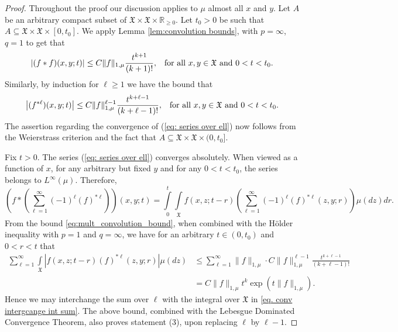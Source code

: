 \documentclass[11pt,reqno]{amsart}
\theoremstyle{remark}
\theoremstyle{definition}
\numberwithin{theorem}{section} \numberwithin{equation}{section}
\newcommand{\X}{\mathfrak{X}}
\begin{document}
\begin{proof} Throughout the proof our discussion applies to $\mu$ almost all $x$ and $y$.  Let $A$ be an arbitrary compact subset of $\X\times \X\times\mathbb{R}_{\geq0}$.
Let $t_0>0$ be such that $A\subseteq \X\times \X\times [0,t_0]$.
We apply Lemma \ref{lem:convolution bounds}, with $p=\infty$, $q=1$ to get that
\begin{equation*}
  \label{eq:4}
\left|(f\ast f)(x,y;t)\right| \leq C \|f\|_{1,\mu}\frac{t^{k+1}}{(k+1)!}, \,\,\,\,\,
\text{\rm for all $x,y\in \X$ and $0<t<t_{0}$.}
\end{equation*}
Similarly, by induction for $\ell\geq 1$ we have the bound that
\begin{equation}
  \label{eq:mult_convolution_bound}
\left|(f^{\ast\ell})(x,y;t)\right|
\leq
C\|f\|_{1,\mu}^{\ell-1}\frac{t^{k+\ell-1}}{(k+\ell-1)!}, \,\,\,\,\,
\text{\rm for all $x,y\in \X$ and $0<t<t_{0}$.}
\end{equation}
The assertion regarding the convergence of (\ref{eq: series over ell}) now follows
from the Weierstrass criterion and the fact that $A\subseteq \X\times \X\times (0,t_0]$.

Fix $t>0$. The series (\ref{eq: series over ell}) converges absolutely.  When viewed as
a function of $x$, for any arbitrary but fixed $y$ and for any $0<t<t_0$, the series belongs to $L^{\infty}(\mu)$. Therefore,
\begin{equation}\label{eq. conv intergcange int sum}
\left(f\ast\left(\sum_{\ell=1}^{\infty}(-1)^{\ell}(f)^{\ast\ell}\right)\right)(x,y;t)= \int\limits_0^t \int\limits_{\X} f(x,z;t-r) \left( \sum_{\ell=1}^{\infty} (-1)^\ell (f)^{\ast \ell}(z,y;r)\right) \mu(dz)  dr.
\end{equation}
From the bound \eqref{eq:mult_convolution_bound}, when combined with the H\" older inequality with $p=1$ and $q=\infty$, we have
for an arbitrary $t\in(0,t_0)$ and $0<r<t$ that
\begin{align*}
\sum_{\ell=1}^{\infty} \int\limits_{\X} \left| f(x,z;t-r) (f)^{\ast \ell}(z,y;r)\right|\mu(dz)& \leq \sum_{\ell=1}^{\infty}\|f\|_{1,\mu} \cdot  C\|f\|_{1,\mu}^{\ell-1}\frac{t^{k+\ell-1}}{(k+\ell-1)!}\\ &= C\|f\|_{1,\mu}t^k \exp(t \|f\|_{1,\mu}).
\end{align*}
Hence we may interchange the sum over $\ell$ with the integral over $\X$ in \eqref{eq. conv intergcange int sum}. The above bound, combined with the Lebesgue Dominated Convergence Theorem, also proves statement (3), upon replacing $\ell$ by $\ell-1$.


\end{proof}
\end{document}
